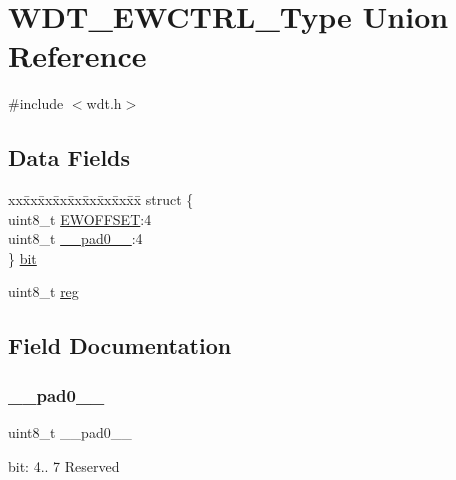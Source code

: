 \hypertarget{union_w_d_t___e_w_c_t_r_l___type}{}\section{W\+D\+T\+\_\+\+E\+W\+C\+T\+R\+L\+\_\+\+Type Union Reference}
\label{union_w_d_t___e_w_c_t_r_l___type}


{\ttfamily \#include $<$wdt.\+h$>$}

\subsection*{Data Fields}
\begin{DoxyCompactItemize}
\item 
\begin{tabbing}
xx\=xx\=xx\=xx\=xx\=xx\=xx\=xx\=xx\=\kill
struct \{\\
\>uint8\_t \mbox{\hyperlink{union_w_d_t___e_w_c_t_r_l___type_af3804ffa2fc8555be85fb7e459584750}{EWOFFSET}}:4\\
\>uint8\_t \mbox{\hyperlink{union_w_d_t___e_w_c_t_r_l___type_a8b4eebe79ded0459acec2f4950102ba3}{\_\_pad0\_\_}}:4\\
\} \mbox{\hyperlink{union_w_d_t___e_w_c_t_r_l___type_acb0a868dcf609ae020716b96ac01a2cd}{bit}}\\

\end{tabbing}\item 
uint8\+\_\+t \mbox{\hyperlink{union_w_d_t___e_w_c_t_r_l___type_a9428adc9af4653a2050e2536b55dec8d}{reg}}
\end{DoxyCompactItemize}


\subsection{Field Documentation}
\mbox{\label{union_w_d_t___e_w_c_t_r_l___type_a8b4eebe79ded0459acec2f4950102ba3}} 
\subsubsection{\texorpdfstring{\_\_pad0\_\_}{\_\_pad0\_\_}}
{\footnotesize\ttfamily uint8\+\_\+t \+\_\+\+\_\+pad0\+\_\+\+\_\+}

bit\+: 4.. 7 Reserved \mbox{\label{union_w_d_t___e_w_c_t_r_l___type_acb0a868dcf609ae020716b96ac01a2cd}} 
